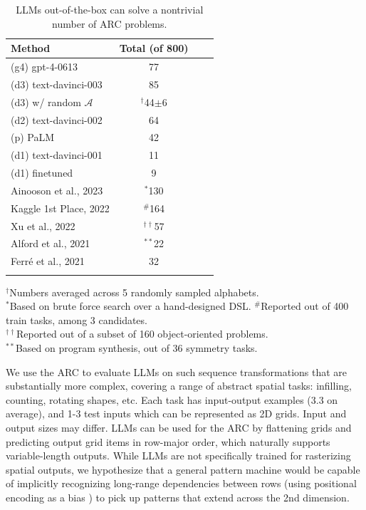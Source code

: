 \documentclass{article}
\begin{document}
\begin{table}
    \vspace{-1.3em}
    \small
    \setlength\tabcolsep{3.5pt}
    \centering
    \begin{tabular}{@{}lccc@{}}
    \toprule
    Method & Total (of 800) \\
    \midrule
    (g4) gpt-4-0613 & 77 \\
    (d3) text-davinci-003 & 85 \\
    (d3) w/ random $\mathcal{A}$ & $^\dagger$44$\pm$6 \\
    (d2) text-davinci-002 \cite{ouyang2022training} & 64 \\
    (p) PaLM \cite{chowdhery2022palm,anil2023palm} & 42 \\
    (d1) text-davinci-001 \cite{brown2020language} & 11 \\
    (d1) finetuned & 9 \\
    \midrule
    Ainooson et al., 2023 \cite{ainooson2023approach}  & $^{*}$130 \\
    Kaggle 1st Place, 2022 \cite{kaggle} & $^\#$164 \\
    Xu et al., 2022 \cite{xu2022graphs} & $^{\dagger\dagger}$57  \\
    Alford et al., 2021 \cite{alford2021neurosymbolic} & $^{**}$22 \\
    Ferré et al., 2021 \cite{ferre2021first} & 32 \\
    \bottomrule
    \vspace{-0.9em}
    \end{tabular}
    \scriptsize
    $^\dagger$Numbers averaged across 5 randomly sampled alphabets.\\
    $^{*}$Based on brute force search over a hand-designed DSL.
    $^\#$Reported out of 400 train tasks, among 3 candidates.\\
    $^{\dagger\dagger}$Reported out of a subset of 160 object-oriented problems.\\
    $^{**}$Based on program synthesis, out of 36 symmetry tasks.\\
    \vspace{-0.7em}
    \caption{
    \small
    LLMs out-of-the-box can solve a nontrivial number of ARC problems.
    \vspace{-3em}
    }
    \label{tab:arc-results}
    \vspace{-1em}
\end{table}
We use the ARC \cite{chollet2019measure}  to evaluate LLMs on such sequence transformations that are substantially more complex, covering a range of abstract spatial tasks: infilling, counting, rotating shapes, etc. Each task has input-output examples (3.3 on average), and 1-3 test inputs which can be represented as 2D grids. Input and output sizes may differ. LLMs can be used for the ARC by flattening grids and predicting output grid items in row-major order, which naturally supports variable-length outputs. While LLMs are not specifically trained for rasterizing spatial outputs, we hypothesize that a general pattern machine would be capable of implicitly recognizing long-range dependencies between rows (using positional encoding as a bias \cite{su2021roformer}) to pick up patterns that extend across the 2nd dimension.
\end{document}
